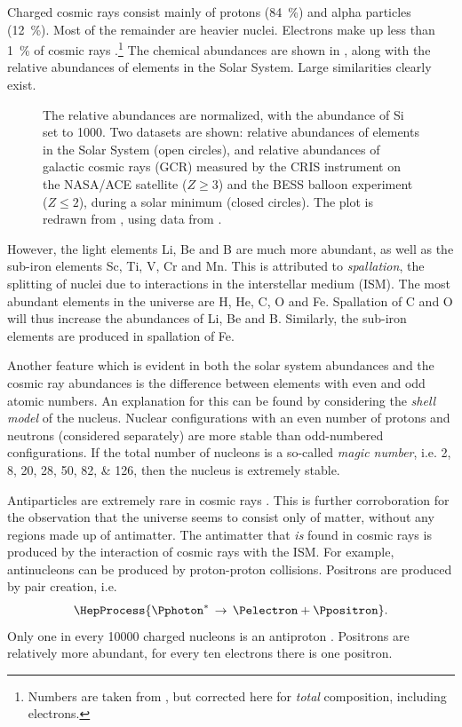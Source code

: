 Charged cosmic rays consist mainly of protons (\SI{84}{\percent}) and alpha
particles (\SI{12}{\percent}). Most of the remainder are heavier nuclei.
Electrons make up less than \SI{1}{\percent} of cosmic rays
\parencite{Grupen:2005}.\footnote{Numbers are taken from \textcite[78,
84]{Grupen:2005}, but corrected here for \emph{total} composition, including
electrons.}  The chemical abundances are shown in
, along with the relative abundances of elements in the
Solar System.  Large similarities clearly exist.
\begin{figure}
\centering
{

}
\caption{  The relative abundances are normalized, with the abundance of Si
set to \num{1000}.  Two datasets are shown: relative abundances
of elements in the Solar System (open circles), and relative abundances of
galactic cosmic rays (GCR) measured by the CRIS instrument on the NASA/ACE
satellite ($Z \geq 3$) and the BESS balloon experiment ($Z \leq 2$),
during a solar minimum (closed circles).  The plot is redrawn from
\cite{George:2009}, using data from
\cites{George:2009}{Lodders:2009}{Wang:2002}{deNolfo:2006}.}
\label{fig:composition}
\end{figure}
However, the light elements Li, Be and B are much more abundant, as well as the
sub-iron elements Sc, Ti, V, Cr and Mn.  This is attributed to
\emph{spallation}, the splitting of nuclei due to interactions in the
interstellar medium (ISM).  The most abundant elements in the universe are H,
He, C, O and Fe.  Spallation of C and O will thus increase the abundances of Li,
Be and B.  Similarly, the sub-iron elements are produced in spallation of Fe.

Another feature which is evident in both the solar system abundances and the
cosmic ray abundances is the difference between elements with even and odd
atomic numbers.  An explanation for this can be found by considering the
\emph{shell model} of the nucleus.  Nuclear configurations with an even number
of protons and neutrons (considered separately) are more stable than
odd-numbered configurations.  If the total number of nucleons is a so-called
\emph{magic number}, i.e.
\numlist[list-final-separator={ or }]{2;8;20;28;50;82;126}, then the nucleus is
extremely stable.

Antiparticles are extremely rare in cosmic rays
\parencites{Smoot:1975}{Picozza:2003}. This is further corroboration for the
observation that the universe seems to consist only of matter, without any
regions made up of antimatter.  The antimatter that \emph{is} found in
cosmic rays is produced by the interaction of cosmic rays with the ISM.  For
example, antinucleons can be produced by proton-proton collisions.
Positrons are produced by pair creation, i.e.
\begin{equation}
\HepProcess{\Pphoton^* \,\to\, \Pelectron + \Ppositron}.
\end{equation}
Only one in every \num{10000} charged nucleons is an antiproton
\parencite{Picozza:2003}. Positrons are relatively more abundant, for every
ten electrons there is one positron.

